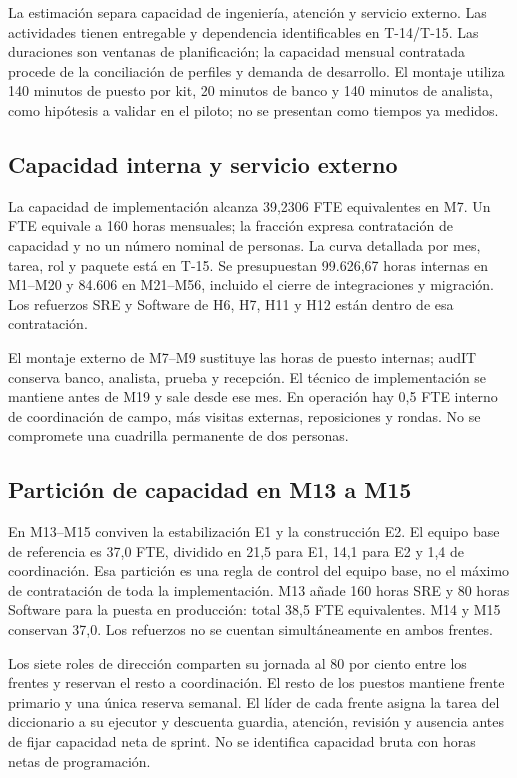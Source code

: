La estimación separa capacidad de ingeniería, atención y servicio externo. Las actividades tienen
entregable y dependencia identificables en T-14/T-15. Las duraciones son ventanas de planificación;
la capacidad mensual contratada procede de la conciliación de perfiles y demanda de desarrollo.
El montaje utiliza 140 minutos de puesto por kit, 20 minutos de banco y 140 minutos de analista,
como hipótesis a validar en el piloto; no se presentan como tiempos ya medidos.

\subsection{Capacidad interna y servicio externo}\label{sec:7-dotacion}

La capacidad de implementación alcanza 39,2306 FTE equivalentes en M7. Un FTE equivale a 160 horas
mensuales; la fracción expresa contratación de capacidad y no un número nominal de personas.
La curva detallada por mes, tarea, rol y paquete está en T-15. Se presupuestan 99.626,67 horas
internas en M1--M20 y 84.606 en M21--M56, incluido el cierre de integraciones y migración.
Los refuerzos SRE y Software de H6, H7, H11 y H12 están dentro de esa contratación.

El montaje externo de M7--M9 sustituye las horas de puesto internas; audIT conserva banco,
analista, prueba y recepción. El técnico de implementación se mantiene antes de M19 y sale
desde ese mes. En operación hay 0,5 FTE interno de coordinación de campo, más visitas externas,
reposiciones y rondas. No se compromete una cuadrilla permanente de dos personas.

\subsection{Partición de capacidad en M13 a M15}\label{sec:7-particion}

En M13--M15 conviven la estabilización E1 y la construcción E2. El equipo base de referencia
es 37,0 FTE, dividido en 21,5 para E1, 14,1 para E2 y 1,4 de coordinación. Esa partición
es una regla de control del equipo base, no el máximo de contratación de toda la implementación.
M13 añade 160 horas SRE y 80 horas Software para la puesta en producción: total 38,5 FTE
equivalentes. M14 y M15 conservan 37,0. Los refuerzos no se cuentan simultáneamente en ambos frentes.

Los siete roles de dirección comparten su jornada al 80 por ciento entre los frentes y reservan
el resto a coordinación. El resto de los puestos mantiene frente primario y una única reserva
semanal. El líder de cada frente asigna la tarea del diccionario a su ejecutor y descuenta
guardia, atención, revisión y ausencia antes de fijar capacidad neta de sprint. No se identifica
capacidad bruta con horas netas de programación.

